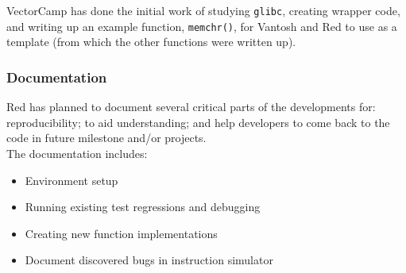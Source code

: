 VectorCamp has done the initial work of studying \texttt{glibc},
creating wrapper code, and writing up an example function, \texttt{memchr()},
for Vantosh and Red to use as a template (from which the other functions were
written up).

\subsubsection{Documentation}

Red has planned to document several critical parts of the developments for:
reproducibility; to aid understanding; and help developers to come back to
the code in future milestone and/or projects.\\

The documentation includes:

\begin{itemize}
  \item Environment setup
  \item Running existing test regressions and debugging
  \item Creating new function implementations
  \item Document discovered bugs in instruction simulator
\end{itemize}













\clearpage